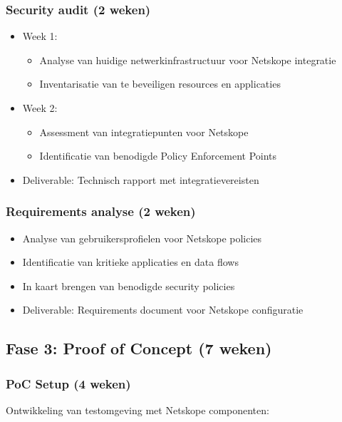 \subsubsection{Security audit (2 weken)}
\begin{itemize}
  \item Week 1: 
  \begin{itemize}
    \item Analyse van huidige netwerkinfrastructuur voor Netskope integratie
    \item Inventarisatie van te beveiligen resources en applicaties
  \end{itemize}
  \item Week 2:
  \begin{itemize}
    \item Assessment van integratiepunten voor Netskope
    \item Identificatie van benodigde Policy Enforcement Points
  \end{itemize}
  \item Deliverable: Technisch rapport met integratievereisten
\end{itemize}

\subsubsection{Requirements analyse (2 weken)}
\begin{itemize}
  \item Analyse van gebruikersprofielen voor Netskope policies
  \item Identificatie van kritieke applicaties en data flows
  \item In kaart brengen van benodigde security policies
  \item Deliverable: Requirements document voor Netskope configuratie
\end{itemize}

\subsection{Fase 3: Proof of Concept (7 weken)}

\subsubsection{PoC Setup (4 weken)}
Ontwikkeling van testomgeving met Netskope componenten:

